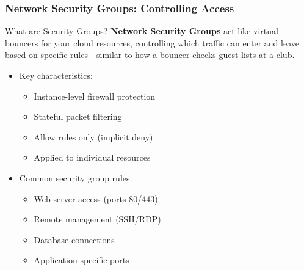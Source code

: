 \documentclass{beamer}
\begin{document}
\begin{frame}
    \frametitle{Network Security Groups: Controlling Access}
    
    \begin{alertblock}{What are Security Groups?}
        \textbf{Network Security Groups} act like virtual bouncers for your cloud resources, controlling which traffic can enter and leave based on specific rules - similar to how a bouncer checks guest lists at a club.
    \end{alertblock}
    
    \begin{itemize}
        \item Key characteristics:
        \begin{itemize}
            \item Instance-level firewall protection
            \item Stateful packet filtering
            \item Allow rules only (implicit deny)
            \item Applied to individual resources
        \end{itemize}
        
        \item Common security group rules:
        \begin{itemize}
            \item Web server access (ports 80/443)
            \item Remote management (SSH/RDP)
            \item Database connections
            \item Application-specific ports
        \end{itemize}
    \end{itemize}
\end{frame}
\end{document}
